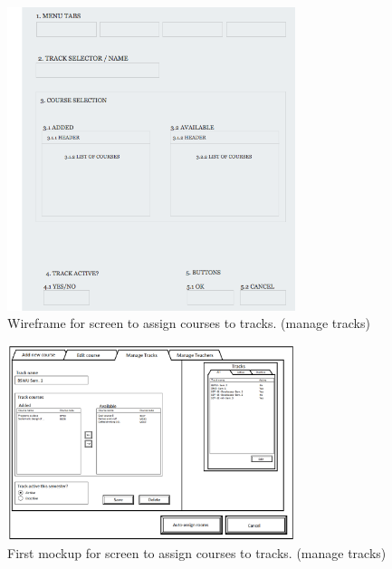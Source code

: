 \clearpage

\begin{figure}[htb]
\begin{center}
\leavevmode
\includegraphics[width=0.75\textwidth]{images/wireframe_tracks}
\end{center}
\caption{Wireframe for screen to assign courses to tracks. (manage tracks)}
\label{fig:app2_mock1_w}
\end{figure}

\begin{figure}[htb]
\begin{center}
\leavevmode
\includegraphics[width=0.75\textwidth]{images/courseplan_managetracks}
\end{center}
\caption{First mockup for screen to assign courses to tracks. (manage tracks)}
\label{fig:app2_mock1_3}
\end{figure}

